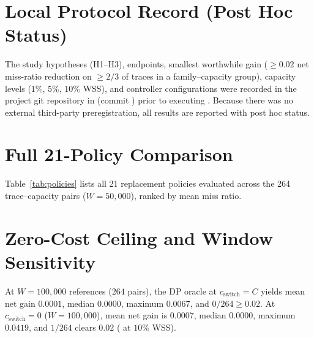 \documentclass[10pt,twocolumn]{article}
\begin{document}

\section{Local Protocol Record (Post Hoc Status)}
\label{sec:protocol}
The study hypotheses (H1--H3), endpoints, smallest worthwhile gain ($\ge 0.02$ net miss-ratio reduction on $\ge 2/3$ of traces in a family--capacity group), capacity levels ($1\%$, $5\%$, $10\%$ WSS), and controller configurations were recorded in the project git repository in  (commit ) prior to executing . Because there was no external third-party preregistration, all results are reported with post hoc status.

\section{Full 21-Policy Comparison}
\label{sec:policies}
Table~\ref{tab:policies} lists all 21 replacement policies evaluated across the 264 trace--capacity pairs ($W=50{,}000$), ranked by mean miss ratio.

\begin{table}[h]
\centering
\scriptsize
\caption{All 21 Policies Across 264 Trace--Capacity Pairs}
\label{tab:policies}

\end{table}

\section{Zero-Cost Ceiling and Window Sensitivity}
\label{sec:zerocost}
\label{sec:window}
At $W=100{,}000$ references ($264$ pairs), the DP oracle at $c_{\text{switch}}=C$ yields mean net gain $0.0001$, median $0.0000$, maximum $0.0067$, and $0/264 \ge 0.02$. At $c_{\text{switch}}=0$ ($W=100{,}000$), mean net gain is $0.0007$, median $0.0000$, maximum $0.0419$, and $1/264$ clears $0.02$ ( at $10\%$ WSS).
\end{document}
